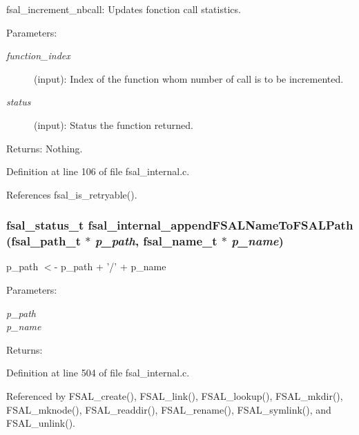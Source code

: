 fsal\_\-increment\_\-nbcall: Updates fonction call statistics.

\begin{Desc}
\item[Parameters:]
\begin{description}
\item[{\em function\_\-index}](input): Index of the function whom number of call is to be incremented. \item[{\em status}](input): Status the function returned.\end{description}
\end{Desc}
\begin{Desc}
\item[Returns:]Nothing. \end{Desc}


Definition at line 106 of file fsal\_\-internal.c.

References fsal\_\-is\_\-retryable().
\subsubsection{\setlength{\rightskip}{0pt plus 5cm}fsal\_\-status\_\-t fsal\_\-internal\_\-append\-FSALName\-To\-FSALPath (fsal\_\-path\_\-t $\ast$ {\em p\_\-path}, fsal\_\-name\_\-t $\ast$ {\em p\_\-name})}\label{fsal__internal_8c_a22}


p\_\-path $<$- p\_\-path + '/' + p\_\-name 

\begin{Desc}
\item[Parameters:]
\begin{description}
\item[{\em p\_\-path}]\item[{\em p\_\-name}]\end{description}
\end{Desc}
\begin{Desc}
\item[Returns:]\end{Desc}


Definition at line 504 of file fsal\_\-internal.c.

Referenced by FSAL\_\-create(), FSAL\_\-link(), FSAL\_\-lookup(), FSAL\_\-mkdir(), FSAL\_\-mknode(), FSAL\_\-readdir(), FSAL\_\-rename(), FSAL\_\-symlink(), and FSAL\_\-unlink().
